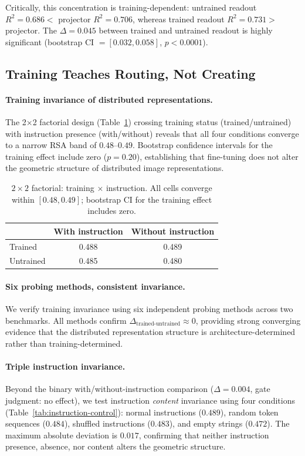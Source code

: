 \documentclass[letterpaper]{article}
\begin{document}
Critically, this concentration is training-dependent: untrained readout $R^2{=}0.686 < $ projector $R^2{=}0.706$, whereas trained readout $R^2{=}0.731 > $ projector. The $\Delta{=}0.045$ between trained and untrained readout is highly significant (bootstrap CI $= [0.032, 0.058]$, $p{<}0.0001$).

\subsection{Training Teaches Routing, Not Creating}
\label{sec:exp-routing}

\paragraph{Training invariance of distributed representations.}
The 2$\times$2 factorial design (Table~\ref{tab:2x2}) crossing training status (trained/untrained) with instruction presence (with/without) reveals that all four conditions converge to a narrow RSA band of $0.48$--$0.49$. Bootstrap confidence intervals for the training effect include zero ($p{=}0.20$), establishing that fine-tuning does not alter the geometric structure of distributed image representations.

\begin{table}[t]
\centering
\caption{$2 \times 2$ factorial: training $\times$ instruction. All cells converge within $[0.48, 0.49]$; bootstrap CI for the training effect includes zero.}
\label{tab:2x2}
\begin{tabular}{lcc}
\toprule
& \textbf{With instruction} & \textbf{Without instruction} \\
\midrule
Trained & 0.488 & 0.489 \\
Untrained & 0.485 & 0.480 \\
\bottomrule
\end{tabular}
\end{table}

\paragraph{Six probing methods, consistent invariance.}
We verify training invariance using six independent probing methods across two benchmarks. All methods confirm $\Delta_{\text{trained-untrained}} \approx 0$, providing strong converging evidence that the distributed representation structure is architecture-determined rather than training-determined.

\paragraph{Triple instruction invariance.}
Beyond the binary with/without-instruction comparison ($\Delta{=}0.004$, gate judgment: no effect), we test instruction \emph{content} invariance using four conditions (Table~\ref{tab:instruction-control}): normal instructions ($0.489$), random token sequences ($0.484$), shuffled instructions ($0.483$), and empty strings ($0.472$). The maximum absolute deviation is $0.017$, confirming that neither instruction presence, absence, nor content alters the geometric structure.
\end{document}
